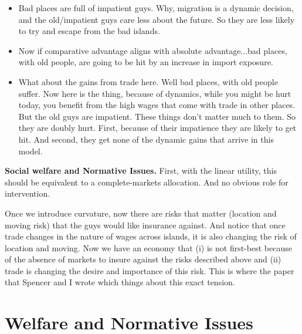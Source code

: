 \documentclass[pdftex,12pt]{article}
\begin{document}
\begin{itemize}
\item Bad places are full of impatient guys. Why, migration is a dynamic decision, and the old/impatient guys care less about the future. So they are less likely to try and escape from the bad islands.

\item Now if comparative advantage aligns with absolute advantage...bad places, with old people, are going to be hit by an increase in import exposure. 

\item What about the gains from trade here. Well bad places, with old people suffer. Now here is the thing, because of dynamics, while you might be hurt today, you benefit from the high wages that come with trade in other places.  But the old guys are impatient. These things don't matter much to them. So they are doubly hurt. First, because of their impatience they are likely to get hit. And second, they get none of the dynamic gains that arrive in this model.
\end{itemize}
\medskip
\noindent \textbf{Social welfare and Normative Issues.} First, with the linear utility, this should be equivalent to a complete-markets allocation. And no obvious role for intervention. 

\medskip
\noindent Once we introduce curvature, now there are risks that matter (location and moving risk) that the guys would like insurance against. And notice that once trade changes in the nature of wages across islands, it is also changing the risk of location and moving. Now we have an economy that (i) is not first-best because of the absence of markets to insure against the risks described above and (ii) trade is changing the desire and importance of this risk. This is where the paper that Spencer and I wrote \citet{lyon2018redistributing} which things about this exact tension.

\medskip
\noindent 



\newpage

\section{Welfare and Normative Issues}





\newpage

\small

\end{document}
